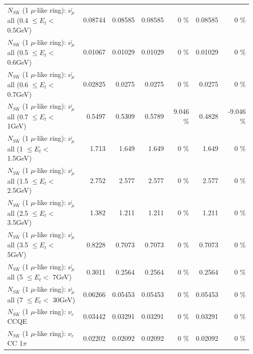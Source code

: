 \begin{table}
\begin{tabular}{| l | r | r | r  r | r  r |}
 $N_{SK}$ (1 $\mu$-like ring): $\bar{\nu_{\mu}}$ all (0.4 $\leq E_{t} <$ 0.5GeV) &         0.08744 &         0.08585 &         0.08585 &        0 \%  &         0.08585 &        0 \%  \\ 
 $N_{SK}$ (1 $\mu$-like ring): $\bar{\nu_{\mu}}$ all (0.5 $\leq E_{t} <$ 0.6GeV) &         0.01067 &         0.01029 &         0.01029 &        0 \%  &         0.01029 &        0 \%  \\ 
 $N_{SK}$ (1 $\mu$-like ring): $\bar{\nu_{\mu}}$ all (0.6 $\leq E_{t} <$ 0.7GeV) &         0.02825 &          0.0275 &          0.0275 &        0 \%  &          0.0275 &        0 \%  \\ 
   $N_{SK}$ (1 $\mu$-like ring): $\bar{\nu_{\mu}}$ all (0.7 $\leq E_{t} <$ 1GeV) &          0.5497 &          0.5309 &          0.5789 &    9.046 \%  &          0.4828 &   -9.046 \%  \\ 
   $N_{SK}$ (1 $\mu$-like ring): $\bar{\nu_{\mu}}$ all (1 $\leq E_{t} <$ 1.5GeV) &           1.713 &           1.649 &           1.649 &        0 \%  &           1.649 &        0 \%  \\ 
 $N_{SK}$ (1 $\mu$-like ring): $\bar{\nu_{\mu}}$ all (1.5 $\leq E_{t} <$ 2.5GeV) &           2.752 &           2.577 &           2.577 &        0 \%  &           2.577 &        0 \%  \\ 
 $N_{SK}$ (1 $\mu$-like ring): $\bar{\nu_{\mu}}$ all (2.5 $\leq E_{t} <$ 3.5GeV) &           1.382 &           1.211 &           1.211 &        0 \%  &           1.211 &        0 \%  \\ 
   $N_{SK}$ (1 $\mu$-like ring): $\bar{\nu_{\mu}}$ all (3.5 $\leq E_{t} <$ 5GeV) &          0.8228 &          0.7073 &          0.7073 &        0 \%  &          0.7073 &        0 \%  \\ 
     $N_{SK}$ (1 $\mu$-like ring): $\bar{\nu_{\mu}}$ all (5 $\leq E_{t} <$ 7GeV) &          0.3011 &          0.2564 &          0.2564 &        0 \%  &          0.2564 &        0 \%  \\ 
    $N_{SK}$ (1 $\mu$-like ring): $\bar{\nu_{\mu}}$ all (7 $\leq E_{t} <$ 30GeV) &         0.06266 &         0.05453 &         0.05453 &        0 \%  &         0.05453 &        0 \%  \\ 
\hline
\hline
\hline
                                      $N_{SK}$ (1 $\mu$-like ring): $\nu_e$ CCQE &         0.03442 &         0.03291 &         0.03291 &        0 \%  &         0.03291 &        0 \%  \\ 
                                 $N_{SK}$ (1 $\mu$-like ring): $\nu_e$ CC 1$\pi$ &         0.02202 &         0.02092 &         0.02092 &        0 \%  &         0.02092 &        0 \%  \\ 

\end{tabular}
\end{table}
